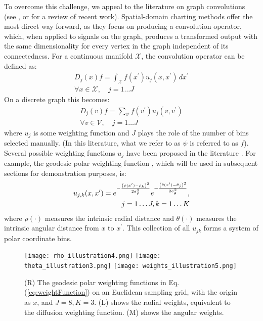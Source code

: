 \documentclass{article}
\begin{document}
To overcome this challenge, we appeal to the literature on graph convolutions (see \citet{niepert2016learning}, \citet{kipf2016semi} or \citet{gdl} for a review of recent work). Spatial-domain charting methods offer the most direct way forward, as they focus on producing a convolution operator, which, when applied to signals on the graph, produces a transformed output with the same dimensionality for every vertex in the graph independent of its connectedness. For a continuous manifold $\mathcal{X}$, the convolution operator can be defined as:
\begin{equation}
\begin{split}
D_j(x)f = \int_{\mathcal{X}} f(x^\prime) u_j(x, x^\prime)\, dx^\prime \\ \forall x \in \mathcal{X}, \quad j = 1\ldots J
\end{split}
\end{equation}
On a discrete graph this becomes:
\begin{equation}\label{eq:discreteconvoperator}
\begin{split}
D_j(v)f = \sum_{\mathcal{V}} f(v^\prime) u_j(v, v^\prime) \\ \forall v \in \mathcal{V}, \quad j = 1\ldots J
\end{split}
\end{equation}
where $u_j$ is some weighting function and $J$ plays the role of the number of bins selected manually. (In this literature, what we refer to as $\psi$ is referred to as $f$). Several possible weighting functions $u_j$ have been proposed in the literature \citep{gdl}. For example, the geodesic polar weighting function \citep{graphNN}, which will be used in subsequent sections for demonstration purposes, is:
\begin{equation}\label{eq:weightFunction}
\begin{split}
u_{j,k}(x, x^\prime) = e^{-\frac{\left(\rho(x^\prime)-\rho_k\right)^2}{2\sigma_\rho^2}}e^{-\frac{\left(\theta(x^\prime)-\theta_j\right)^2}{2\sigma_\theta^2}}, \\ j = 1\ldots J, k = 1\ldots K
\end{split}
\end{equation}
where $\rho(\cdot)$ measures the intrinsic radial distance and $\theta(\cdot)$ measures the intrinsic angular distance from $x$ to $x^\prime$. This collection of all $u_{jk}$ forms a system of polar coordinate bins.

\begin{figure}
\centering
\texttt{[image: rho\_illustration4.png]}
\texttt{[image: theta\_illustration3.png]}
\texttt{[image: weights\_illustration5.png]}
\caption{(R) The geodesic polar weighting functions in Eq. (\ref{eq:weightFunction}) on an Euclidean sampling grid, with the origin as $x$, and $J=8, K=3$. (L) shows the radial weights, equivalent to the diffusion weighting function. (M) shows the angular weights. }\label{fig:weights}
\vspace{-.5cm}
\end{figure}
\end{document}
